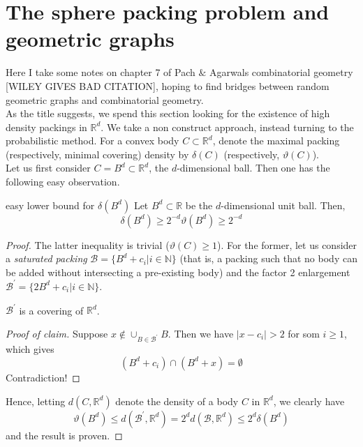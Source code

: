 \documentclass{article}
\begin{document}
\newpage 

\section{The sphere packing problem and geometric graphs}

Here I take some notes on chapter 7 of Pach $\&$ Agarwals combinatorial geometry [WILEY GIVES BAD CITATION], 
hoping to find bridges between random geometric graphs and combinatorial geometry. \\ 

As the title suggests, we spend this section looking for the existence of high density packings in $\mathbb{R}^d$. 
We take a non construct approach, instead turning to the probabilistic method. For a convex body $C \subset \mathbb{R}^d$, 
denote the maximal packing (respectively, minimal covering) density by $\delta(C)$ (respectively, $\vartheta(C)$). \\

Let us first consider $C = B^d \subset \mathbb{R}^d$, the $d$-dimensional ball. Then one has the following easy 
observation. 

\begin{proposition}[]{easy lower bound for $\delta(B^d)$}
    Let $B^d \subset \mathbb{R}$ be the $d$-dimensional unit ball. Then, 
    \[\delta(B^d) \geq 2^{-d}\vartheta(B^d) \geq 2^{-d}\]
\end{proposition}

\begin{proof}
    The latter inequality is trivial ($\vartheta(C) \geq 1$). For the former, let us consider a {\it saturated 
    packing} $\mathcal{B} = \{B^d + c_i | i \in \mathbb{N}\}$ (that is, a packing such that 
    no body can be added without intersecting a pre-existing body) and the factor 2 enlargement 
    $\mathcal{B}^\prime = \{2B^d + c_i | i \in \mathbb{N}\}$.
    \begin{claim}
        $\mathcal{B}^\prime$ is a covering of $\mathbb{R}^d$.
    \end{claim}
    \begin{proof}[Proof of claim]
        Suppose $x \notin \cup_{B \in \mathcal{B}^\prime} B$. Then we have $\lvert x - c_i \rvert > 2$ for som $i \geq 1$, 
        which gives \[(B^d + c_i) \cap (B^d + x) = \emptyset\] Contradiction!
    \end{proof}
    Hence, letting $d(C, \mathbb{R}^d)$ denote the density of a body $C$ in $\mathbb{R}^d$, we clearly have 
    \[\vartheta(B^d) \leq d(\mathcal{B}^\prime, \mathbb{R}^d) = 2^d d(\mathcal{B}, \mathbb{R}^d) \leq 2^d \delta(B^d)\] 
    and the result is proven. 
\end{proof}
\end{document}

